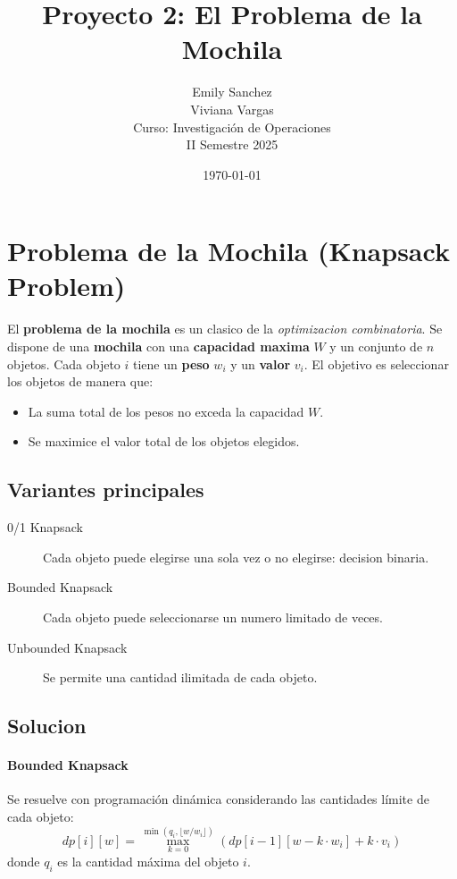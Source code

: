 \documentclass{article}
\title{Proyecto 2: El Problema de la Mochila}
\author{Emily Sanchez \\ Viviana Vargas \\[1cm] Curso: Investigación de Operaciones \\ II Semestre 2025}
\date{\today}
\begin{document}
\maketitle

\thispagestyle{empty}
\newpage
\setcounter{page}{1}

\section{Problema de la Mochila (Knapsack Problem)}

El \textbf{problema de la mochila} es un clasico de la \textit{optimizacion combinatoria}. Se dispone de una \textbf{mochila} con una \textbf{capacidad maxima} $W$ y un conjunto de $n$ objetos. Cada objeto $i$ tiene un \textbf{peso} $w_i$ y un \textbf{valor} $v_i$. El objetivo es seleccionar los objetos de manera que:
\begin{itemize}
  \item La suma total de los pesos no exceda la capacidad $W$.
  \item Se maximice el valor total de los objetos elegidos.
\end{itemize}

\subsection{Variantes principales}
\begin{description}
  \item[0/1 Knapsack] Cada objeto puede elegirse una sola vez o no elegirse: decision binaria.
  \item[Bounded Knapsack] Cada objeto puede seleccionarse un numero limitado de veces.
  \item[Unbounded Knapsack] Se permite una cantidad ilimitada de cada objeto.
\end{description}

\subsection{Solucion}
\paragraph{Bounded Knapsack} Se resuelve con programación dinámica considerando las cantidades límite de cada objeto:
\[
dp[i][w] = \max_{k=0}^{\min(q_i, \lfloor w/w_i \rfloor)} \left( dp[i-1][w - k \cdot w_i] + k \cdot v_i \right)
\]
donde $q_i$ es la cantidad máxima del objeto $i$.
\end{document}
